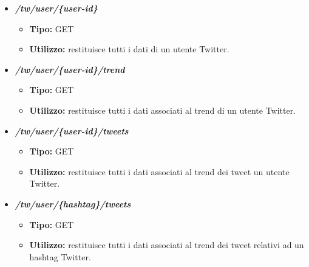 \begin{itemize}
  \item \textit{\textbf{/tw/user/\{user-id\}}}
  \begin{itemize}
    \item \textbf{Tipo:} GET
    \item \textbf{Utilizzo:} restituisce tutti i dati di un utente Twitter.
  \end{itemize}
  \item \textit{\textbf{/tw/user/\{user-id\}/trend}}
  \begin{itemize}
    \item \textbf{Tipo:} GET
    \item \textbf{Utilizzo:} restituisce tutti i dati associati al trend di un utente Twitter.
  \end{itemize}
  \item \textit{\textbf{/tw/user/\{user-id\}/tweets}}
  \begin{itemize}
    \item \textbf{Tipo:} GET
    \item \textbf{Utilizzo:} restituisce tutti i dati associati al trend dei tweet un utente Twitter.
  \end{itemize}
  \item \textit{\textbf{/tw/user/\{hashtag\}/tweets}}
  \begin{itemize}
    \item \textbf{Tipo:} GET
    \item \textbf{Utilizzo:} restituisce tutti i dati associati al trend dei tweet relativi ad un hashtag Twitter.
  \end{itemize}


\end{itemize}
